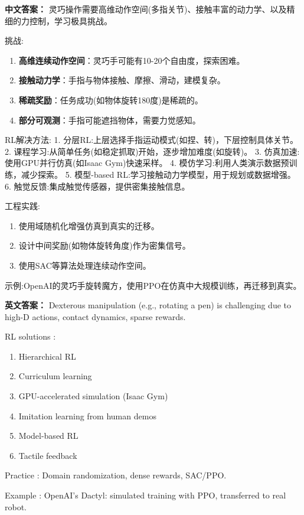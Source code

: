 \documentclass[10pt,a4paper]{ctexart}
\begin{document}
\textbf{中文答案：}  
灵巧操作需要高维动作空间(多指关节)、接触丰富的动力学、以及精细的力控制，学习极具挑战。

 挑战:
\begin{enumerate}
    \item \textbf{高维连续动作空间}：灵巧手可能有10-20个自由度，探索困难。
    \item \textbf{接触动力学}：手指与物体接触、摩擦、滑动，建模复杂。
    \item \textbf{稀疏奖励}：任务成功(如物体旋转180度)是稀疏的。
    \item \textbf{部分可观测}：手指可能遮挡物体，需要力觉感知。
\end{enumerate}

 RL解决方法:
1.  分层RL:上层选择手指运动模式(如捏、转)，下层控制具体关节。
2.  课程学习:从简单任务(如稳定抓取)开始，逐步增加难度(如旋转)。
3.  仿真加速:使用GPU并行仿真(如Isaac Gym)快速采样。
4.  模仿学习:利用人类演示数据预训练，减少探索。
5.  模型-based RL:学习接触动力学模型，用于规划或数据增强。
6.  触觉反馈:集成触觉传感器，提供密集接触信息。

 工程实践:
\begin{enumerate}
    \item 使用域随机化增强仿真到真实的迁移。
    \item 设计中间奖励(如物体旋转角度)作为密集信号。
    \item 使用SAC等算法处理连续动作空间。
\end{enumerate}

 示例:OpenAI的灵巧手旋转魔方，使用PPO在仿真中大规模训练，再迁移到真实。

\textbf{英文答案：}  
Dexterous manipulation (e.g., rotating a pen) is challenging due to high-D actions, contact dynamics, sparse rewards.

 RL solutions :
\begin{enumerate}
    \item Hierarchical RL
    \item Curriculum learning
    \item GPU-accelerated simulation (Isaac Gym)
    \item Imitation learning from human demos
    \item Model-based RL
    \item Tactile feedback
\end{enumerate}

 Practice : Domain randomization, dense rewards, SAC/PPO.

 Example : OpenAI's Dactyl: simulated training with PPO, transferred to real robot.
\end{document}
